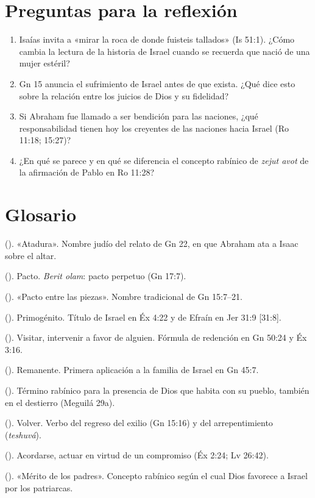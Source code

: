 \section*{Preguntas para la reflexión}
\begin{enumerate}
\item Isaías invita a «mirar la roca de donde fuisteis tallados» (Is 51:1). ¿Cómo cambia la lectura de la historia de Israel cuando se recuerda que nació de una mujer estéril?
\item Gn 15 anuncia el sufrimiento de Israel antes de que exista. ¿Qué dice esto sobre la relación entre los juicios de Dios y su fidelidad?
\item Si Abraham fue llamado a ser bendición para las naciones, ¿qué responsabilidad tienen hoy los creyentes de las naciones hacia Israel (Ro 11:18; 15:27)?
\item ¿En qué se parece y en qué se diferencia el concepto rabínico de \emph{zejut avot} de la afirmación de Pablo en Ro 11:28?
\end{enumerate}

\section*{Glosario}
\begin{description}\small
\item[Akedá] (). «Atadura». Nombre judío del relato de Gn 22, en que Abraham ata a Isaac sobre el altar.
\item[Berit] (). Pacto. \emph{Berit olam}: pacto perpetuo (Gn 17:7).
\item[Berit bein ha-betarim] (). «Pacto entre las piezas». Nombre tradicional de Gn 15:7–21.
\item[Bejor] (). Primogénito. Título de Israel en Éx 4:22 y de Efraín en Jer 31:9 [31:8].
\item[Paqad] (). Visitar, intervenir a favor de alguien. Fórmula de redención en Gn 50:24 y Éx 3:16.
\item[She'erit] (). Remanente. Primera aplicación a la familia de Israel en Gn 45:7.
\item[Shejiná] (). Término rabínico para la presencia de Dios que habita con su pueblo, también en el destierro (Meguilá 29a).
\item[Shuv] (). Volver. Verbo del regreso del exilio (Gn 15:16) y del arrepentimiento (\emph{teshuvá}).
\item[Zajar] (). Acordarse, actuar en virtud de un compromiso (Éx 2:24; Lv 26:42).
\item[Zejut avot] (). «Mérito de los padres». Concepto rabínico según el cual Dios favorece a Israel por los patriarcas.
\end{description}

